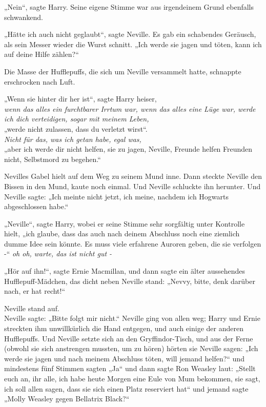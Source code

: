 {„Nein“, sagte Harry. Seine eigene Stimme war aus irgendeinem Grund ebenfalls schwankend.

„Hätte ich auch nicht geglaubt“, sagte Neville. Es gab ein schabendes Geräusch, als sein Messer wieder die Wurst schnitt. „Ich werde sie jagen und töten, kann ich auf deine Hilfe zählen?“

Die Masse der Hufflepuffs, die sich um Neville versammelt hatte, schnappte erschrocken nach Luft.

„Wenn sie hinter dir her ist“, sagte Harry heiser,\\ \emph{wenn das alles ein furchtbarer Irrtum war, wenn das alles eine Lüge war, werde ich dich verteidigen, sogar mit meinem Leben,}\\ „werde nicht zulassen, dass du verletzt wirst“.\\ \emph{Nicht für das, was ich getan habe, egal was,}\\ „aber ich werde dir nicht helfen, sie zu jagen, Neville, Freunde helfen Freunden nicht, Selbstmord zu begehen.“

Nevilles Gabel hielt auf dem Weg zu seinem Mund inne. Dann steckte Neville den Bissen in den Mund, kaute noch einmal. Und Neville schluckte ihn herunter. Und Neville sagte: „Ich meinte nicht jetzt, ich meine, nachdem ich Hogwarts abgeschlossen habe.“

„Neville“, sagte Harry, wobei er seine Stimme sehr sorgfältig unter Kontrolle hielt, „ich glaube, dass das auch nach deinem Abschluss noch eine ziemlich dumme Idee sein könnte. Es muss viele erfahrene Auroren geben, die sie verfolgen -“ \emph{oh oh,} \emph{warte, das ist nicht gut -}

„Hör auf ihn!“, sagte Ernie Macmillan, und dann sagte ein älter aussehendes Hufflepuff-Mädchen, das dicht neben Neville stand: „Nevvy, bitte, denk darüber nach, er hat recht!“

Neville stand auf.\\ Neville sagte: „Bitte folgt mir nicht.“ Neville ging von allen weg; Harry und Ernie streckten ihm unwillkürlich die Hand entgegen, und auch einige der anderen Hufflepuffs. Und Neville setzte sich an den Gryffindor-Tisch, und aus der Ferne (obwohl sie sich anstrengen mussten, um zu hören) hörten sie Neville sagen: „Ich werde sie jagen und nach meinem Abschluss töten, will jemand helfen?“ und mindestens fünf Stimmen sagten „Ja“ und dann sagte Ron Weasley laut: „Stellt\\ euch an, ihr alle, ich habe heute Morgen eine Eule von Mum bekommen, sie sagt, ich soll allen sagen, dass sie sich einen Platz reserviert hat“ und jemand sagte „Molly Weasley gegen Bellatrix Black?“

}
